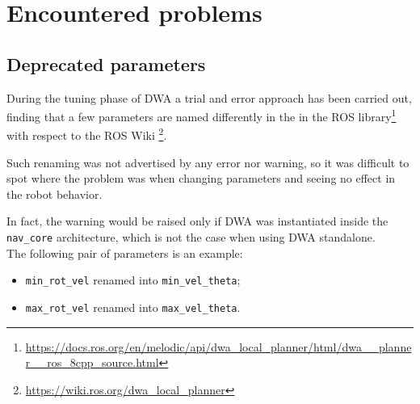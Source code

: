 \documentclass[11pt,a4paper]{article}
\begin{document}

\section{Encountered problems}



\subsection{Deprecated parameters}

During the tuning phase of DWA a trial and error approach has been carried out, finding that
a few parameters are named differently in the in the ROS library\footnote
{\href{https://docs.ros.org/en/melodic/api/dwa\_local\_planner/html/dwa\_\_planner\_\_ros\_8cpp\_source.html}
{https://docs.ros.org/en/melodic/api/dwa\_local\_planner/html/dwa\_\_planner\_\_ros\_8cpp\_source.html}}
with respect to the ROS Wiki
\footnote{\href{https://wiki.ros.org/dwa\_local\_planner}{https://wiki.ros.org/dwa\_local\_planner}}.

Such renaming was not advertised by any error nor warning, so it was difficult to spot where the problem
was when changing parameters and seeing no effect in the robot behavior.

In fact, the warning would be raised only if DWA was instantiated inside the \texttt{nav\_core} architecture,
which is not the case when using DWA standalone.\\

The following pair of parameters is an example:
\begin{itemize}
 \item \texttt{min\_rot\_vel} renamed into \texttt{min\_vel\_theta};
 \item \texttt{max\_rot\_vel} renamed into \texttt{max\_vel\_theta}.\\
\end{itemize}
\end{document}

